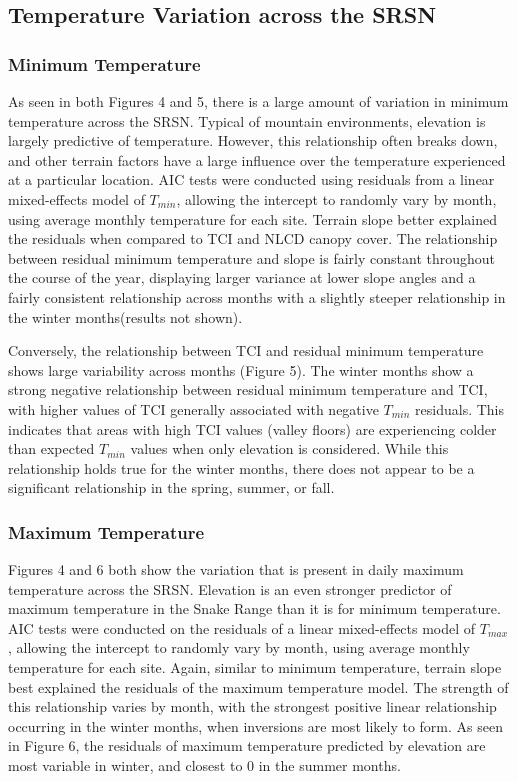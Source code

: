 \documentclass{ametsoc}
\begin{document}
\subsection{Temperature Variation across the SRSN} \subsubsection{Minimum
Temperature} As seen in both Figures 4 and 5, there is a large amount of
variation in minimum temperature across the SRSN. Typical of mountain
environments, elevation is largely predictive of temperature. However, this
relationship often breaks down, and other terrain factors have a large influence
over the temperature experienced at a particular location. AIC tests were
conducted using residuals from a linear mixed-effects model of $T_{min}$,
allowing the intercept to randomly vary by month, using average monthly temperature
for each site. Terrain slope better explained the residuals when compared to TCI
and NLCD canopy cover. The relationship between residual minimum temperature and
slope is fairly constant throughout the course of the year, displaying larger
variance at lower slope angles and a fairly consistent relationship across
months with a slightly steeper relationship in the winter months(results not
shown).

Conversely, the relationship between TCI and residual minimum temperature shows
large variability across months (Figure 5). The winter months show a strong
negative relationship between residual minimum temperature and TCI, with higher
values of TCI generally associated with negative $T_{min}$ residuals. This
indicates that areas with high TCI values (valley floors) are experiencing
colder than expected $T_{min}$ values when only elevation is considered. While
this relationship holds true for the winter months, there does not appear to be
a significant relationship in the spring, summer, or fall.

\subsubsection{Maximum Temperature} 
Figures 4 and 6 both show the variation that
is present in daily maximum temperature across the SRSN. Elevation is an even
stronger predictor of maximum temperature in the Snake Range than it is for
minimum temperature. AIC tests were conducted on the residuals of a linear
mixed-effects model of $T_{max}$, allowing the intercept to randomly vary by
month, using average monthly temperature for each site. Again, similar to
minimum temperature, terrain slope best explained the residuals of the maximum
temperature model. The strength of this relationship varies by month, with the
strongest positive linear relationship occurring in the winter months, when
inversions are most likely to form. As seen in Figure 6, the residuals of
maximum temperature predicted by elevation are most variable in winter, and
closest to 0 in the summer months.
\end{document}
